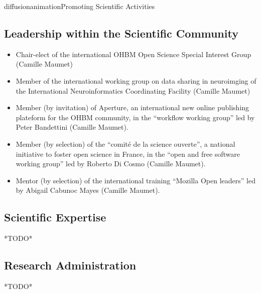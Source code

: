 \documentclass{ra2018}
\begin{document}
\begin{module}{diffusion}{animation}{Promoting Scientific Activities}
\subsection{Leadership within the Scientific Community}
\begin{itemize}
    \item Chair-elect of the international OHBM Open Science Special Interest Group (Camille Maumet)
    \item Member of the international working group on data sharing in neuroimging of the International Neuroinformatics Coordinating Facility (Camille Maumet)
    \item Member (by invitation) of Aperture, an international new online publishing plateform for the OHBM community, in the ``workflow working group'' led by Peter Bandettini  (Camille Maumet).
    \item Member (by selection) of the ``comité de la science ouverte'', a national initiative to foster open science in France, in the ``open and free software working group'' led by Roberto Di Cosmo  (Camille Maumet).
    \item Mentor (by selection) of the international training ``Mozilla Open leaders'' led by Abigail Cabunoc Mayes (Camille Maumet).
\end{itemize}    
\subsection{Scientific Expertise}
*TODO*
\subsection{Research Administration}
*TODO*
  
\end{module}
\end{document}
